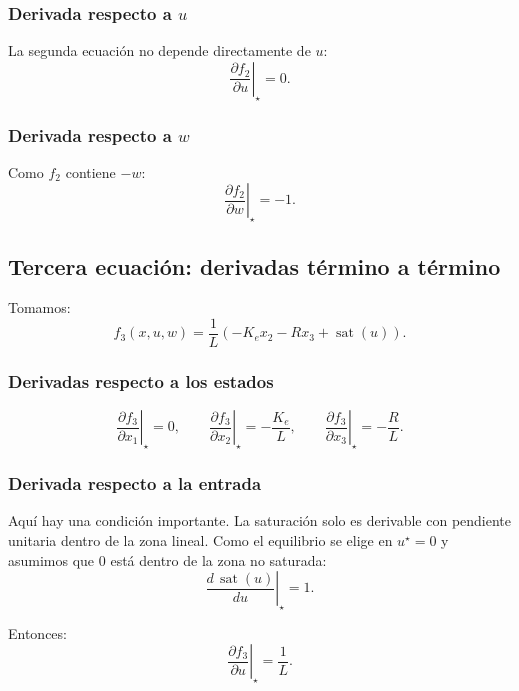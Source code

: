 \documentclass[11pt]{article}
\begin{document}
\subsubsection{Derivada respecto a $u$}

La segunda ecuaci\'on no depende directamente de $u$:
\begin{equation}
\left.\frac{\partial f_2}{\partial u}\right|_\star = 0.
\end{equation}

\subsubsection{Derivada respecto a $w$}

Como $f_2$ contiene $-w$:
\begin{equation}
\left.\frac{\partial f_2}{\partial w}\right|_\star = -1.
\label{eq:df2dw}
\end{equation}

\subsection{Tercera ecuaci\'on: derivadas t\'ermino a t\'ermino}

Tomamos:
\[
f_3(x,u,w)=
\frac{1}{L}
\left(
-K_e x_2
-R x_3
+\operatorname{sat}(u)
\right).
\]

\subsubsection{Derivadas respecto a los estados}

\[
\left.\frac{\partial f_3}{\partial x_1}\right|_\star=0,
\qquad
\left.\frac{\partial f_3}{\partial x_2}\right|_\star=-\frac{K_e}{L},
\qquad
\left.\frac{\partial f_3}{\partial x_3}\right|_\star=-\frac{R}{L}.
\]

\subsubsection{Derivada respecto a la entrada}

Aqu\'i hay una condici\'on importante. La saturaci\'on solo es derivable con pendiente unitaria dentro de la zona lineal. Como el equilibrio se elige en $u^\star=0$ y asumimos que $0$ est\'a dentro de la zona no saturada:
\[
\left.\frac{d\,\operatorname{sat}(u)}{du}\right|_\star = 1.
\]

Entonces:
\begin{equation}
\left.\frac{\partial f_3}{\partial u}\right|_\star = \frac{1}{L}.
\label{eq:df3du}
\end{equation}
\end{document}
